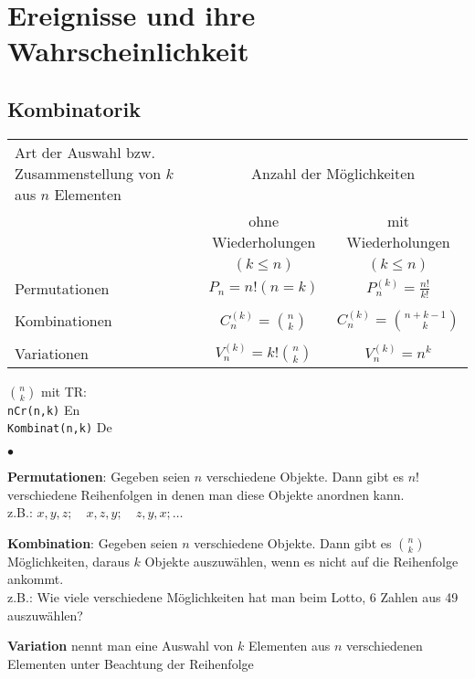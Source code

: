 \section{Ereignisse und ihre Wahrscheinlichkeit}
	\subsection{Kombinatorik}
		\begin{minipage}{13.5cm}
		\begin{tabular}{| p{5.5cm} | c | c |}
			\hline
			Art der Auswahl bzw. Zusammenstellung von $k$ aus $n$ Elementen
			& \multicolumn{2}{c|}{Anzahl der Möglichkeiten}\\
 			& ohne Wiederholungen		& mit Wiederholungen\\
 			& $(k\leq n)$ 				& $(k\leq n)$ \\
 			\hline
 			Permutationen & $P_n=n!(n=k)$ &
 			$P_n^{(k)}=\frac{n!}{k!}$ \\ & &\\
 			Kombinationen & $C_n^{(k)}=\binom n k$ &
 			$C_n^{(k)}=\binom{n+k-1} k$\\
 			& &\\
 			Variationen & $V_n^{(k)}=k!\binom n k$ & $V_n^{(k)}=n^k$\\
 			\hline
		\end{tabular}
		\end{minipage}
		\begin{minipage}{5cm}
		$\binom n k$ mit TR: \\
		\texttt{nCr(n,k)} \hspace{19.5mm}En\\
		\texttt{Kombinat(n,k)} \hspace{9.3mm} De
		\end{minipage}
		\begin{list}{$\bullet$}{\setlength{\itemsep}{0cm} \setlength{\parsep}{0cm} \setlength{\topsep}{0.1cm}} 
         	\item \textbf{Permutationen}: Gegeben seien $n$ verschiedene Objekte. Dann gibt es $n!$
         	verschiedene Reihenfolgen in denen man diese Objekte anordnen
         	kann. \\
         	z.B.: $x,y,z;\quad x,z,y;\quad z,y,x;\ldots$
		 	\item \textbf{Kombination}: Gegeben seien $n$ verschiedene Objekte. Dann gibt es $\binom n k$
		 	Möglichkeiten, daraus $k$ Objekte auszuwählen, wenn es nicht auf die Reihenfolge
		 	ankommt. \\
		 	z.B.: Wie viele verschiedene Möglichkeiten hat man beim Lotto, 6 Zahlen aus 49
		 	auszuwählen?
		  \item \textbf{Variation} nennt man eine Auswahl von $k$ Elementen aus $n$
		  		verschiedenen Elementen unter Beachtung der Reihenfolge
        \end{list}
        

